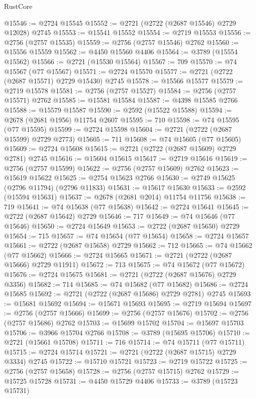 \begin{lexlean}{RustCore}
\begin{coremodule}
@15546 := @2724 @15545
@15552 := @2721 (@2722 (@2687 @15546) @2729 @12028) @2745
@15553 := @15541 @15552
@15554 := @2719 @15553
@15556 := @2756 (@2757 @15535)
@15559 := @2756 (@2757 @15546) @2762
@15560 := @15556 @15559
@15562 := @4450 @15560 @4406
@15564 := @3789 (@15554 @15562)
@15566 := @2721 (@15530 @15564)
@15567 := 709
@15570 := @74 @15567 (@77 @15567)
@15571 := @2724 @15570
@15577 := @2721 (@2722 (@2687 @15571) @2729 @15430) @2745
@15578 := @15566 @15577
@15579 := @2719 @15578
@15581 := @2756 (@2757 @15527)
@15584 := @2756 (@2757 @15571) @2762
@15585 := @15581 @15584
@15587 := @4398 @15585 @2766
@15588 := @15579 @15587
@15590 := @2592 (@15522 @15588)
@15594 := @2678 (@2681 @1956) @11754 @2607
@15595 := 710
@15598 := @74 @15595 (@77 @15595)
@15599 := @2724 @15598
@15604 := @2721 (@2722 (@2687 @15599) @2729 @2773)
@15605 := 711
@15608 := @74 @15605 (@77 @15605)
@15609 := @2724 @15608
@15615 := @2721 (@2722 (@2687 @15609) @2729 @2781) @2745
@15616 := @15604 @15615
@15617 := @2719 @15616
@15619 := @2756 (@2757 @15599)
@15622 := @2756 (@2757 @15609) @2762
@15623 := @15619 @15622
@15625 := @2754 @15623 @2766
@15630 := @2749 @15625 (@2796 @11794) (@2796 @11833)
@15631 := @15617 @15630
@15633 := @2592 (@15594 @15631)
@15637 := @2678 (@2681 @2014) @11754 @11756
@15638 := 719
@15641 := @74 @15638 (@77 @15638)
@15642 := @2724 @15641
@15645 := @2722 (@2687 @15642) @2729
@15646 := 717
@15649 := @74 @15646 (@77 @15646)
@15650 := @2724 @15649
@15653 := @2722 (@2687 @15650) @2729
@15654 := 715
@15657 := @74 @15654 (@77 @15654)
@15658 := @2724 @15657
@15661 := @2722 (@2687 @15658) @2729
@15662 := 712
@15665 := @74 @15662 (@77 @15662)
@15666 := @2724 @15665
@15671 := @2721 (@2722 (@2687 @15666) @2729 @11911)
@15672 := 713
@15675 := @74 @15672 (@77 @15672)
@15676 := @2724 @15675
@15681 := @2721 (@2722 (@2687 @15676) @2729 @3356)
@15682 := 714
@15685 := @74 @15682 (@77 @15682)
@15686 := @2724 @15685
@15692 := @2721 (@2722 (@2687 @15686) @2729 @2781) @2745
@15693 := @15681 @15692
@15694 := @15671 @15693
@15695 := @2719 @15694
@15697 := @2756 (@2757 @15666)
@15699 := @2756 (@2757 @15676)
@15702 := @2756 (@2757 @15686) @2762
@15703 := @15699 @15702
@15704 := @15697 @15703
@15706 := @3966 @15704 @2766
@15708 := @3789 (@15695 @15706)
@15710 := @2721 (@15661 @15708)
@15711 := 716
@15714 := @74 @15711 (@77 @15711)
@15715 := @2724 @15714
@15721 := @2721 (@2722 (@2687 @15715) @2729 @3334) @2745
@15722 := @15710 @15721
@15723 := @2719 @15722
@15725 := @2756 (@2757 @15658)
@15728 := @2756 (@2757 @15715) @2762
@15729 := @15725 @15728
@15731 := @4450 @15729 @4406
@15733 := @3789 (@15723 @15731)

\end{coremodule}
\end{lexlean}
